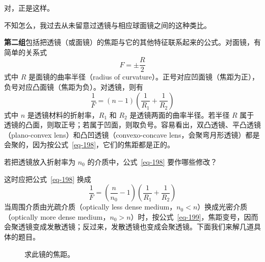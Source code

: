 \begin{dialogue}
\tchr 对，正是这样。

\stda 不知怎么，我过去从未留意过透镜与相应球面镜之间的这种类比。

\tchr \textbf{第二组}包括把透镜（或面镜）的焦距与它的其他特征联系起来的公式。对面镜，有简单的关系式
 \begin{equation}%
F = \pm \frac{R}{2}
\label{eq-197}
\end{equation}
式中 $R$ 是面镜的曲率半径（radius of curvature）。正号对应凹面镜（焦距为正），负号对应凸面镜（焦距为负）。对透镜，则有
\begin{equation}%
\frac{1}{F} = (n-1) \left( \frac{1}{R_{1}} + \frac{1}{R_{2}} \right)
\label{eq-198}
\end{equation}
 式中 $n$ 是透镜材料的折射率，$R_{1}$ 和 $R_{2}$ 是透镜两面的曲率半径。若半径 $R$ 属于透镜的凸面，则取正号；若属于凹面，则取负号。容易看出，双凸透镜、平凸透镜（plano-convex lens）和凸凹透镜（convexo-concave lens，会聚弯月形透镜）都是会聚的，因为按公式~\eqref{eq-198}，它们的焦距都是正的。

\stda 若把透镜放入折射率为 $n_{0}$ 的介质中，公式~\eqref{eq-198} 要作哪些修改？

\tchr 这时应把公式~\eqref{eq-198} 换成
\begin{equation}%
\frac{1}{F} = \left( \frac{n}{n_{0}} - 1\right) \left( \frac{1}{R_{1}} + \frac{1}{R_{2}} \right)
\label{eq-199}
\end{equation}
当周围介质由光疏介质（optically less dense medium，$n_{0}<n$）换成光密介质（optically more dense medium，$n_{0}>n$）时，按公式~\eqref{eq-199}，焦距变号，因而会聚透镜变成发散透镜；反过来，发散透镜也变成会聚透镜。下面我们来解几道具体的题目。
\begin{figure}%
\centering

\caption[求此镜的焦距。]{求此镜的焦距。\label{fig-140}}
\end{figure}


\end{dialogue}
